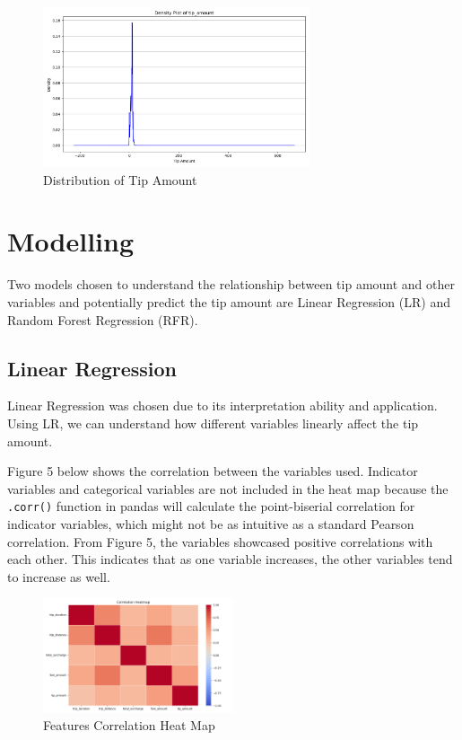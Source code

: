 \documentclass[11pt]{article}
\begin{document}
\begin{figure}[h]
    \includegraphics[width=0.7\textwidth]{plots/tip_amount_density_JFK.png}
    \centering
    \caption{Distribution of Tip Amount} 
\end{figure}

\section{Modelling}
Two models chosen to understand the relationship between tip amount and other variables and potentially predict the tip amount are Linear Regression (LR) and Random Forest Regression (RFR). 

\subsection{Linear Regression}
Linear Regression was chosen due to its interpretation ability and application. Using LR, we can understand how different variables linearly affect the tip amount.

Figure 5 below shows the correlation between the variables used. Indicator variables and categorical variables are not included in the heat map because the \texttt{.corr()} function in pandas will calculate the point-biserial correlation for indicator variables, which might not be as intuitive as a standard Pearson correlation. From Figure 5, the variables showcased positive correlations with each other. This indicates that as one variable increases, the other variables tend to increase as well. 

\begin{figure}[h]
    \includegraphics[width=0.5\textwidth]{plots/features_correlation_heatmap_JFK.png}
    \centering
    \caption{Features Correlation Heat Map} 
\end{figure}
\end{document}
